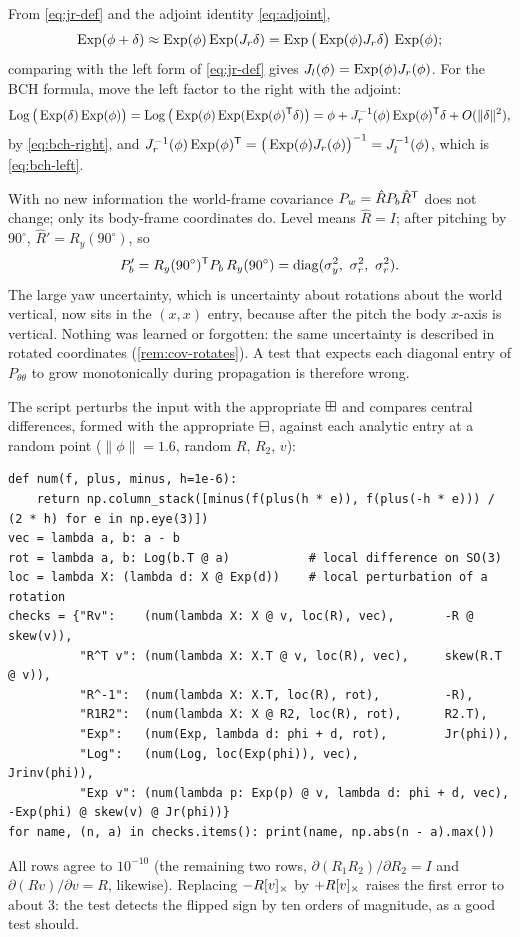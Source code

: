 \begin{solutions}
  \item From \eqref{eq:jr-def} and the adjoint identity \eqref{eq:adjoint},
        \[
          \operatorname{Exp}(\phi + \delta) \approx \operatorname{Exp}(\phi)\operatorname{Exp}(J_r\delta) = \operatorname{Exp}\big(\operatorname{Exp}(\phi)J_r\delta\big)\,\operatorname{Exp}(\phi);
        \]
        comparing with the left form of \eqref{eq:jr-def} gives $J_l(\phi) = \operatorname{Exp}(\phi)J_r(\phi)$. For the BCH formula, move the left factor to the right with the adjoint:
        \[
          \operatorname{Log}\big(\operatorname{Exp}(\delta)\operatorname{Exp}(\phi)\big) = \operatorname{Log}\big(\operatorname{Exp}(\phi)\operatorname{Exp}(\operatorname{Exp}(\phi)^{\mathsf{T}}\delta)\big) = \phi + J_r^{-1}(\phi)\operatorname{Exp}(\phi)^{\mathsf{T}}\delta + O(\|\delta\|^2),
        \]
        by \eqref{eq:bch-right}, and $J_r^{-1}(\phi)\operatorname{Exp}(\phi)^{\mathsf{T}} = \big(\operatorname{Exp}(\phi)J_r(\phi)\big)^{-1} = J_l^{-1}(\phi)$, which is \eqref{eq:bch-left}.

  \item With no new information the world-frame covariance $P_w = \hat RP_b\hat R^{\mathsf{T}}$ does not change; only its body-frame coordinates do. Level means
        $\hat R = I$; after pitching by $90^\circ$, $\hat R' = R_y(90^\circ)$, so
        \[
          P_b' = R_y(90^\circ)\T P_b\,R_y(90^\circ) = \diag(\sigma_y^2,\ \sigma_r^2,\ \sigma_r^2).
        \]
        The large yaw uncertainty, which is uncertainty about rotations about the world vertical, now sits in the $(x, x)$ entry, because after the
        pitch the body $x$-axis is vertical. Nothing was learned or forgotten: the same uncertainty is described in rotated coordinates
        (\cref{rem:cov-rotates}). A test that expects each diagonal entry of $P_{\theta\theta}$ to grow monotonically during propagation is therefore wrong.

  \item The script perturbs the input with the appropriate $\boxplus$ and compares central differences, formed with the appropriate $\boxminus$,
        against each analytic entry at a random point ($\|\phi\| = 1.6$, random $R$, $R_2$, $v$):
\begin{lstlisting}[style=py]
def num(f, plus, minus, h=1e-6):
    return np.column_stack([minus(f(plus(h * e)), f(plus(-h * e))) / (2 * h) for e in np.eye(3)])
vec = lambda a, b: a - b
rot = lambda a, b: Log(b.T @ a)           # local difference on SO(3)
loc = lambda X: (lambda d: X @ Exp(d))    # local perturbation of a rotation
checks = {"Rv":    (num(lambda X: X @ v, loc(R), vec),       -R @ skew(v)),
          "R^T v": (num(lambda X: X.T @ v, loc(R), vec),     skew(R.T @ v)),
          "R^-1":  (num(lambda X: X.T, loc(R), rot),         -R),
          "R1R2":  (num(lambda X: X @ R2, loc(R), rot),      R2.T),
          "Exp":   (num(Exp, lambda d: phi + d, rot),        Jr(phi)),
          "Log":   (num(Log, loc(Exp(phi)), vec),            Jrinv(phi)),
          "Exp v": (num(lambda p: Exp(p) @ v, lambda d: phi + d, vec), -Exp(phi) @ skew(v) @ Jr(phi))}
for name, (n, a) in checks.items(): print(name, np.abs(n - a).max())
\end{lstlisting}
        All rows agree to $10^{-10}$ (the remaining two rows, $\partial(R_1R_2)/\partial R_2 = I$ and $\partial(Rv)/\partial v = R$, likewise). Replacing $-R[v]_{\times}$ by
        $+R[v]_{\times}$ raises the first error to about $3$: the test detects the flipped sign by ten orders of magnitude, as a good test should.
\end{solutions}
